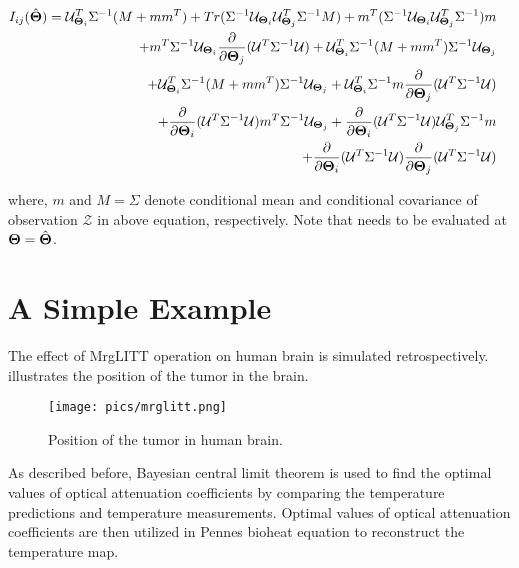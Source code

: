 \documentclass[]{article}
\begin{document}
\begin{eqnarray}\label{fisher_expand}
I_{ij}(\hat{\boldsymbol{\Theta}})=\mathcal{U}^T_{\boldsymbol{\Theta}_i}\Sigma^{-1}(M+mm^T)
+Tr(\Sigma^{-1}\mathcal{U}_{\boldsymbol{\Theta}_i}\mathcal{U}^T_{\boldsymbol{\Theta}_j}\Sigma^{-1}M)
+m^T(\Sigma^{-1}\mathcal{U}_{\boldsymbol{\Theta}_i}\mathcal{U}^T_{\boldsymbol{\Theta}_j}\Sigma^{-1})m\nonumber\\
+m^T\Sigma^{-1}\mathcal{U}_{\boldsymbol{\Theta}_i}\frac{\partial}{\partial \boldsymbol{\Theta}_j}(\mathcal{U}^T\Sigma^{-1}\mathcal{U})
+\mathcal{U}^T_{\boldsymbol{\Theta}_i}\Sigma^{-1}(M+mm^T)\Sigma^{-1}\mathcal{U}_{\boldsymbol{\Theta}_j}\nonumber\\
+\mathcal{U}^T_{\boldsymbol{\Theta}_i}\Sigma^{-1}(M+mm^T)\Sigma^{-1}\mathcal{U}_{\boldsymbol{\Theta}_j}
+\mathcal{U}^T_{\boldsymbol{\Theta}_i}\Sigma^{-1}m\frac{\partial}{\partial \boldsymbol{\Theta}_j}(\mathcal{U}^T\Sigma^{-1}\mathcal{U})\nonumber\\
+\frac{\partial}{\partial\boldsymbol{\Theta}_i}(\mathcal{U}^T\Sigma^{-1}\mathcal{U})m^T\Sigma^{-1}\mathcal{U}_{\boldsymbol{\Theta}_j}
+\frac{\partial}{\partial \boldsymbol{\Theta}_i}(\mathcal{U}^T\Sigma^{-1}\mathcal{U})\mathcal{U}^T_{\boldsymbol{\Theta}_j}\Sigma^{-1}m
\nonumber \\
+\frac{\partial}{\partial \boldsymbol{\Theta}_i}(\mathcal{U}^T\Sigma^{-1}\mathcal{U})\frac{\partial}{\partial \boldsymbol{\Theta}_j}(\mathcal{U}^T\Sigma^{-1}\mathcal{U})&
\end{eqnarray}


where, $m$ and $M=\Sigma$ denote conditional mean and conditional covariance of observation $\mathcal{Z}$ in above equation, respectively. Note that  needs to be evaluated at $\boldsymbol{\Theta}=\hat{\boldsymbol{\Theta}}$.



\section*{A Simple Example}
The effect of MrgLITT operation on human brain is simulated retrospectively.  illustrates the position of the tumor in the brain.


\begin{figure}[htb]
\centering
\texttt{[image: pics/mrglitt.png]}
\caption{Position of the tumor in human brain.}\label{mrglitt}
\end{figure}

As described before, Bayesian central limit theorem is used to find the optimal values of optical attenuation coefficients by comparing the temperature predictions and temperature measurements. Optimal values of optical attenuation coefficients are then utilized in Pennes bioheat equation to reconstruct the temperature map.
\end{document}
